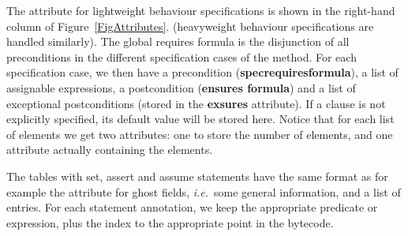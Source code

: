 The attribute for lightweight behaviour specifications is shown in the
right-hand column of Figure~\ref{FigAttributes}. (heavyweight behaviour
specifications are handled similarly).  The global requires formula is
the disjunction of all preconditions in the different specification
cases of the method. For each specification case, we then have a
precondition (\textbf{spec\unsc requires\unsc formula}), a list of
assignable expressions, a postcondition (\textbf{ensures\unsc
formula}) and a list of exceptional postconditions (stored in the
\textbf{exsures} attribute). If a clause is not explicitly specified,
its default value will be stored here. Notice that for each list of
elements we get two attributes: one to store the number of elements,
and one attribute actually containing the elements.

The tables with set, assert and assume statements have the same format
as for example the attribute for ghost fields, \emph{i.e.}\ some
general information, and a list of entries. For each statement
annotation, we keep the appropriate predicate or expression, plus the
index to the appropriate point in the bytecode.



